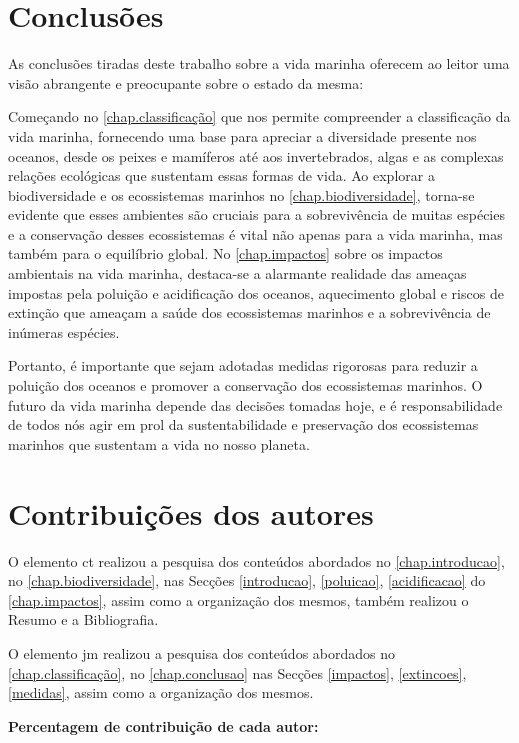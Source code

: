 \documentclass{report}
\begin{document}
\chapter{Conclusões}
\label{chap.conclusao}
As conclusões tiradas deste trabalho sobre a vida marinha oferecem ao leitor uma visão abrangente e preocupante sobre o estado da mesma:

Começando no \autoref{chap.classificação} que nos permite compreender a classificação da vida marinha, fornecendo uma base para apreciar a diversidade presente nos oceanos, desde os peixes e mamíferos até aos invertebrados, algas e as complexas relações ecológicas que sustentam essas formas de vida. Ao explorar a biodiversidade e os ecossistemas marinhos no \autoref{chap.biodiversidade}, torna-se evidente que esses ambientes são cruciais para a sobrevivência de muitas espécies e a conservação desses ecossistemas é vital não apenas para a vida marinha, mas também para o equilíbrio global. No \autoref{chap.impactos} sobre os impactos ambientais na vida marinha, destaca-se a alarmante realidade das ameaças impostas pela poluição e acidificação dos oceanos, aquecimento global e riscos de extinção que ameaçam a saúde dos ecossistemas marinhos e a sobrevivência de inúmeras espécies.

Portanto, é importante que sejam adotadas medidas rigorosas para reduzir a poluição dos oceanos e promover a conservação dos ecossistemas marinhos. O futuro da vida marinha depende das decisões tomadas hoje, e é responsabilidade de todos nós agir em prol da sustentabilidade e preservação dos ecossistemas marinhos que sustentam a vida no nosso planeta.


\chapter*{Contribuições dos autores}
O elemento \ac{ct} realizou a pesquisa dos conteúdos abordados no \autoref{chap.introducao}, no \autoref{chap.biodiversidade}, nas Secções \ref{introducao}, \ref{poluicao}, \ref{acidificacao} do \autoref{chap.impactos}, assim como a organização dos mesmos, também realizou o Resumo e a Bibliografia.

O elemento \ac{jm} realizou a pesquisa dos conteúdos abordados no \autoref{chap.classificação}, no \autoref{chap.conclusao} nas Secções \ref{impactos}, \ref{extincoes}, \ref{medidas}, assim como a organização dos mesmos.

\vspace{10pt}
\textbf{Percentagem de contribuição de cada autor:}\\
\end{document}

